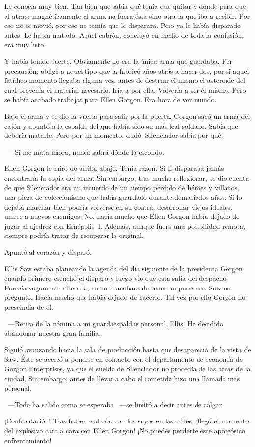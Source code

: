 Le conocía muy bien. Tan bien que sabía qué tenía que quitar y dónde para que al atraer magnéticamente el arma no fuera ésta sino otra la que iba a recibir. Por eso no se movió, por eso no temía que le disparara. Pero ya le había disparado antes. Le había matado. Aquel cabrón, concluyó en medio de toda la confusión, era muy listo.

Y había tenido suerte. Obviamente no era la única arma que guardaba. Por precaución, obligó a aquel tipo que la fabricó años atrás a hacer dos, por si aquel fatídico momento llegaba alguna vez, antes de destruir él mismo el asteroide del cual provenía el material necesario. Iría a por ella. Volvería a ser él mismo. Pero se había acabado trabajar para Ellen Gorgon. Era hora de ver mundo.

Bajó el arma y se dio la vuelta para salir por la puerta. Gorgon sacó un arma del cajón y apuntó a la espalda del que había sido su más leal soldado. Sabía que debería matarle. Pero por un momento, dudó. Silenciador sabía por qué.

~---Si me mata ahora, nunca sabrá dónde la escondo.

Ellen Gorgon le miró de arriba abajo. Tenía razón. Si le disparaba jamás encontraría la copia del arma. Sin embargo, tras mucho reflexionar, se dio cuenta de que Silenciador era un recuerdo de un tiempo perdido de héroes y villanos, una pieza de coleccionismo que había guardado durante demasiados años. Si lo dejaba marchar bien podría volverse en su contra, desarrollar viejos ideales, unirse a nuevos enemigos. No, hacía mucho que Ellen Gorgon había dejado de jugar al ajedrez con Ernépolis~I. Además, aunque fuera una posibilidad remota, siempre podría tratar de recuperar la original.

Apuntó al corazón y disparó.

Ellis Saw estaba planeando la agenda del día siguiente de la presidenta Gorgon cuando primero escuchó el disparo y luego vio que ésta salía del despacho. Parecía vagamente alterada, como si acabara de tener un percance. Saw no preguntó. Hacía mucho que había dejado de hacerlo. Tal vez por ello Gorgon no prescindía de él.

~---Retira de la nómina a mi guardaespaldas personal, Ellis. Ha decidido abandonar nuestra gran familia.

Siguió avanzando hacia la sala de producción hasta que desapareció de la vista de Saw. Éste se acercó a ponerse en contacto con el departamento de economía de Gorgon Enterprises, ya que el sueldo de Silenciador no procedía de las arcas de la ciudad. Sin embargo, antes de llevar a cabo el cometido hizo una llamada más personal.

~---Todo ha salido como se esperaba ~---se limitó a decir antes de colgar.

\begin{next}
    ¡Confrontación! Tras haber acabado con los suyos en las calles, ¡llegó el momento del explosivo cara a cara con Ellen Gorgon! ¡No puedes perderte este apoteósico enfrentamiento!
\end{next}

\endinput
